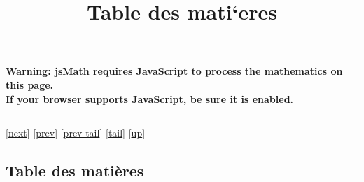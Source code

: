 \documentclass[]{article}
\title{Table des mati`eres}
\author{}
\date{}
\begin{document}
\maketitle

\textbf{Warning: \href{http://www.math.union.edu/locate/jsMath}{jsMath}
requires JavaScript to process the mathematics on this page.\\ If your
browser supports JavaScript, be sure it is enabled.}

\begin{center}\rule{3in}{0.4pt}\end{center}

{[}\href{coursch2.html}{next}{]} {[}\href{coursch1.html}{prev}{]}
{[}\href{coursch1.html\#tailcoursch1.html}{prev-tail}{]}
{[}\hyperref[tailcoursli1.html]{tail}{]}
{[}\href{cours.html\#coursli1.html}{up}{]}

\subsection{Table des matières}
\end{document}
